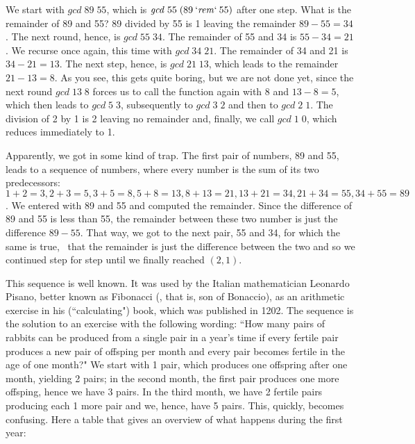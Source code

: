 \documentclass{scrreprt}
\newcommand{\Varid}[1]{\mathit{#1}}
\begin{document}
We start with \ensuremath{\Varid{gcd}\;\mathrm{89}\;\mathrm{55}}, which is
\ensuremath{\Varid{gcd}\;\mathrm{55}\;(\mathrm{89}\mathbin{\Varid{`rem`}}\mathrm{55})} after one step.
What is the remainder of 89 and 55?
89 divided by 55 is 1 leaving the remainder 
$89 - 55 = 34$.
The next round, hence, is \ensuremath{\Varid{gcd}\;\mathrm{55}\;\mathrm{34}}.
The remainder of 55 and 34 is $55 - 34 = 21$.
We recurse once again, this time with \ensuremath{\Varid{gcd}\;\mathrm{34}\;\mathrm{21}}.
The remainder of 34 and 21 is $34 - 21 = 13$.
The next step, hence, is \ensuremath{\Varid{gcd}\;\mathrm{21}\;\mathrm{13}},
which leads to the remainder $21 - 13 = 8$.
As you see, this gets quite boring, 
but we are not done yet,
since the next round \ensuremath{\Varid{gcd}\;\mathrm{13}\;\mathrm{8}}
forces us to call the function again with 8 and $13 - 8 = 5$,
which then leads to \ensuremath{\Varid{gcd}\;\mathrm{5}\;\mathrm{3}}, subsequently to
\ensuremath{\Varid{gcd}\;\mathrm{3}\;\mathrm{2}} and then to \ensuremath{\Varid{gcd}\;\mathrm{2}\;\mathrm{1}}.
The division of 2 by 1 is 2 leaving no remainder
and, finally, we call \ensuremath{\Varid{gcd}\;\mathrm{1}\;\mathrm{0}},
which reduces immediately to 1.

Apparently, we got in some kind of trap.
The first pair of numbers, 89 and 55,
leads to a sequence of numbers, where 
every number is the sum of its two predecessors:
$1 + 2 = 3, 2 + 3 = 5, 3 + 5 = 8, 5 + 8 = 13,
 8 + 13 = 21, 13 + 21 = 34, 21 + 34 = 55, 34 + 55 = 89$.
We entered with 89 and 55 and 
computed the remainder.
Since the difference of 89 and 55
is less than 55,
the remainder between these two number
is just the difference $89-55$.
That way,
we got to the next pair, 55 and 34,
for which the same is true,
\viz\ that the remainder is just
the difference between the two and so 
we continued step for step 
until we finally reached $(2,1)$.

This sequence is well known.
It was used by the Italian mathematician
Leonardo Pisano, better known as Fibonacci
(, that is, son of Bonaccio),
as an arithmetic exercise in his 
(``calculating") book, which was published in 1202.
The sequence is the solution to an exercise
with the following wording:
``How many pairs of rabbits can be produced
  from a single pair in a year's time
  if every fertile pair produces a new pair
  of offsping per month and every pair
  becomes fertile in the age of one month?"
We start with 1 pair, which produces one offspring
after one month, yielding 2 pairs; in the second month,
the first pair produces one more offsping,
hence we have 3 pairs. In the third month,
we have 2 fertile pairs producing each 1 more pair
and we, hence, have 5 pairs. 
This, quickly, becomes confusing.
Here a table that gives an overview of what happens
during the first year:
\end{document}
